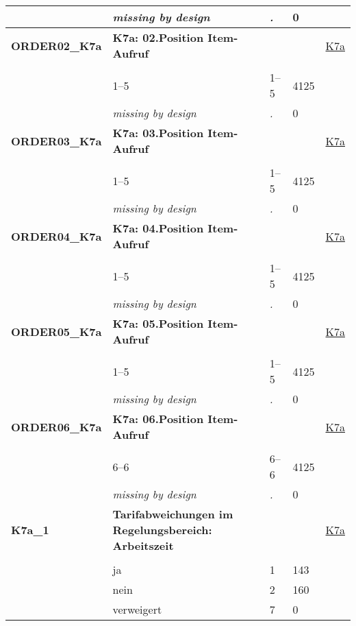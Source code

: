\begin{longtable}{| L{2.65cm} | L{8cm} | C{1.5cm} | R{1.25cm} | C{2.25cm}  |}
   & \textit{missing by design} & \textit{.} & 0 &  \\ 
   \midrule
\textbf{ORDER02\_K7a}\label{var:ORDER02:K7a} & \textbf{K7a: 02.Position Item-Aufruf} &  &  & \hyperref[K7a]{K7a} \\ 
   &  &  &  &  \\ 
   & 1--5 & 1--5 & 4125 &  \\ 
   & \textit{missing by design} & \textit{.} & 0 &  \\ 
   \midrule
\textbf{ORDER03\_K7a}\label{var:ORDER03:K7a} & \textbf{K7a: 03.Position Item-Aufruf} &  &  & \hyperref[K7a]{K7a} \\ 
   &  &  &  &  \\ 
   & 1--5 & 1--5 & 4125 &  \\ 
   & \textit{missing by design} & \textit{.} & 0 &  \\ 
   \midrule
\textbf{ORDER04\_K7a}\label{var:ORDER04:K7a} & \textbf{K7a: 04.Position Item-Aufruf} &  &  & \hyperref[K7a]{K7a} \\ 
   &  &  &  &  \\ 
   & 1--5 & 1--5 & 4125 &  \\ 
   & \textit{missing by design} & \textit{.} & 0 &  \\ 
   \midrule
\textbf{ORDER05\_K7a}\label{var:ORDER05:K7a} & \textbf{K7a: 05.Position Item-Aufruf} &  &  & \hyperref[K7a]{K7a} \\ 
   &  &  &  &  \\ 
   & 1--5 & 1--5 & 4125 &  \\ 
   & \textit{missing by design} & \textit{.} & 0 &  \\ 
   \midrule
\textbf{ORDER06\_K7a}\label{var:ORDER06:K7a} & \textbf{K7a: 06.Position Item-Aufruf} &  &  & \hyperref[K7a]{K7a} \\ 
   &  &  &  &  \\ 
   & 6--6 & 6--6 & 4125 &  \\ 
   & \textit{missing by design} & \textit{.} & 0 &  \\ 
   \midrule
\textbf{K7a\_1}\label{var:K7a:1} & \textbf{Tarifabweichungen im Regelungsbereich: Arbeitszeit} &  &  & \hyperref[K7a]{K7a} \\ 
   &  &  &  &  \\ 
   & ja & 1 & 143 &  \\ 
   & nein & 2 & 160 &  \\ 
   & verweigert & 7 & 0 &  \\ 

\end{longtable}
